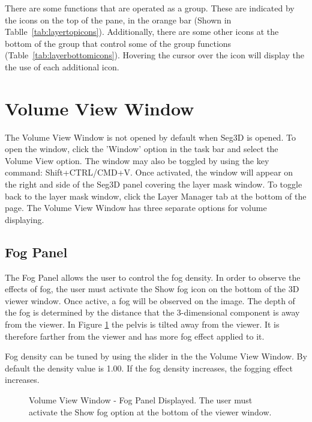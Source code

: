 \documentclass[fleqn,11pt,openany]{book}
\begin{document}
 There are some functions that are operated as a group.  These are indicated by the icons on the top of the pane, in the orange bar (Shown in Tablle~\ref{tab:layertopicons}).  Additionally, there are some other icons at the bottom of the group that control some of the group functions (Table~\ref{tab:layerbottomicons}).  Hovering the cursor over the icon will display the the use of each additional icon.




\section{Volume View Window}
The Volume View Window is not opened by default when Seg3D is opened.  
To open the window, click the 'Window' option in the task bar and select the Volume View option.  
The window may also be toggled by using the key command: Shift+CTRL/CMD+V. 
Once activated, the window will appear on the right and side of the Seg3D panel covering the layer mask window.
To toggle back to the layer mask window, click the Layer Manager tab at the bottom of the page.
The Volume View Window has three separate options for volume displaying.



\subsection{Fog Panel}
\label{sec:fog}


The Fog Panel allows the user to control the fog density.  
In order to observe the effects of fog, the user must activate the Show fog icon on the bottom of the 3D viewer window.
Once active, a fog will be observed on the image.  
The depth of the fog is determined by the distance that the 3-dimensional component is away from the viewer.   
In Figure \ref{fig:FogPanel} the pelvis is tilted away from the viewer.
It is therefore farther from the viewer and has more fog effect applied to it.

Fog density can be tuned by using the slider in the the Volume View Window.  
By default the density value is 1.00.
If the fog density increases, the fogging effect increases.
\begin{figure}[t]
\caption{Volume View Window - Fog Panel Displayed. The user must activate the Show fog option at the bottom of the viewer window.}\label{fig:FogPanel}
\end{figure}
\end{document}
